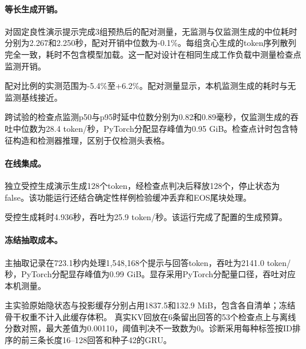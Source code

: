 \paragraph{等长生成开销。}对固定良性演示提示完成3组预热后的配对测量，无监测与仅监测生成的中位耗时分别为2.267和2.250秒，配对开销中位数为-0.1\%。每组贪心生成的token序列散列完全一致，耗时不包含模型加载。这一配对设计在相同生成工作负载中测量检查点监测开销。

配对比例的实测范围为-5.4\%至+6.2\%。配对测量显示，本机监测生成的耗时与无监测基线接近。

跨试验的检查点监测p50与p95时延中位数分别为0.82和0.89毫秒，仅监测生成的吞吐中位数为28.4 token/秒，PyTorch分配显存峰值为0.95 GiB。检查点计时包含特征构造和检测器推理，区别于仅检测头表格。

\paragraph{在线集成。}独立受控生成演示生成128个token，经检查点判决后释放128个，停止状态为false。该功能运行还结合确定性样例检验缓冲丢弃和EOS尾块处理。

受控生成耗时4.936秒，吞吐为25.9 token/秒。该运行完成了配置的生成预算。

\paragraph{冻结抽取成本。}主抽取记录在723.1秒内处理1,548,168个提示与回答token，吞吐为2141.0 token/秒，PyTorch分配显存峰值为0.99 GiB。显存采用PyTorch分配量口径，吞吐对应本机测量。

主实验原始隐状态与投影缓存分别占用1837.5和132.9 MiB，包含各自清单；冻结骨干权重不计入此缓存体积。
真实KV回放在6条留出回答的53个检查点上与离线分数对照，最大差值为0.00110，阈值判决不一致数为0。诊断采用每种标签按ID排序的前三条长度16--128回答和种子42的GRU。
